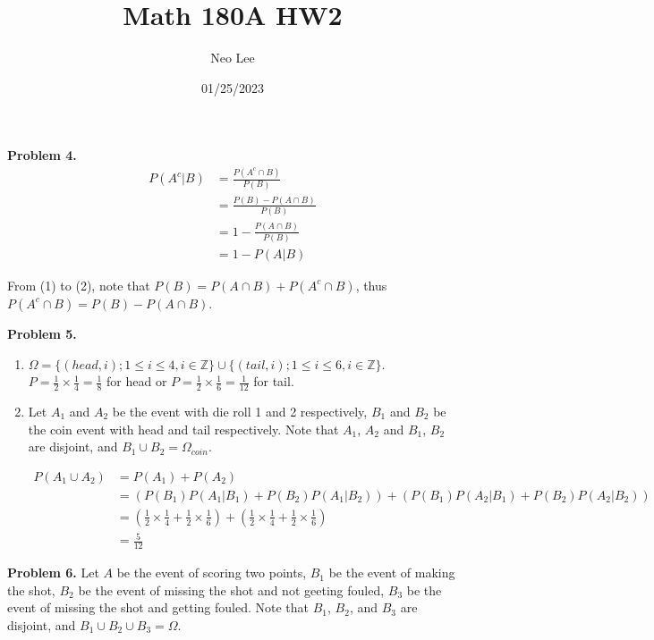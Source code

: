 \documentclass{article}
\title{Math 180A HW2}
\author{Neo Lee}
\date{01/25/2023}
\begin{document}
 

\maketitle 

\textbf{Problem 4.}
\begin{align}
    P(A^c | B) & = \frac{P(A^c \cap B)}{P(B)} \\
    & = \frac{P(B) - P(A \cap B)}{P(B)} \\ 
    & = 1 - \frac{P(A \cap B)}{P(B)} \\
    & = 1 - P(A | B) 
\end{align}

From (1) to (2), note that $P(B) = P(A \cap B) + P(A^c \cap B)$, thus $P(A^c \cap B) = P(B) - P(A \cap B)$.
\bigbreak

\textbf{Problem 5. }
\begin{enumerate}[label={(\alph*)}]
    \item  
    $\Omega = \{(head, i); 1 \le i \le 4, i \in \mathbb{Z} \} \cup \{(tail, i); 1 \le i \le 6, i \in \mathbb{Z} \}$. 
    $P = \frac{1}{2} \times \frac{1}{4} = \frac{1}{8}$ for head or $P = \frac{1}{2} \times \frac{1}{6} = \frac{1}{12}$ for tail.

    \item Let $A_1$ and $A_2$ be the event with die roll 1 and 2 respectively, $B_1$ and $B_2$ be the coin event with head and tail respectively. 
    Note that $A_1$, $A_2$ and $B_1$, $B_2$ are disjoint, and $B_1 \cup B_2 = \Omega_{coin}$.

    \begin{align}
        P(A_1 \cup A_2) & = P(A_1) + P(A_2) \\
        & = (P(B_1)P(A_1 | B_1) + P(B_2)P(A_1 | B_2)) + (P(B_1)P(A_2 | B_1) + P(B_2)P(A_2 | B_2)) \\ 
        & = (\frac{1}{2} \times \frac{1}{4} + \frac{1}{2} \times \frac{1}{6}) + (\frac{1}{2} \times \frac{1}{4} + \frac{1}{2} \times \frac{1}{6}) \\ 
        & = \frac{5}{12}
    \end{align}
\end{enumerate}
\bigbreak

\textbf{Problem 6.} 
Let $A$ be the event of scoring two points, $B_1$ be the event of making the shot, $B_2$ be the event of missing the shot and not geeting fouled, $B_3$ be the event of missing the shot and getting fouled. 
Note that $B_1$, $B_2$, and $B_3$ are disjoint, and $B_1 \cup B_2 \cup B_3 = \Omega$.
\end{document}
